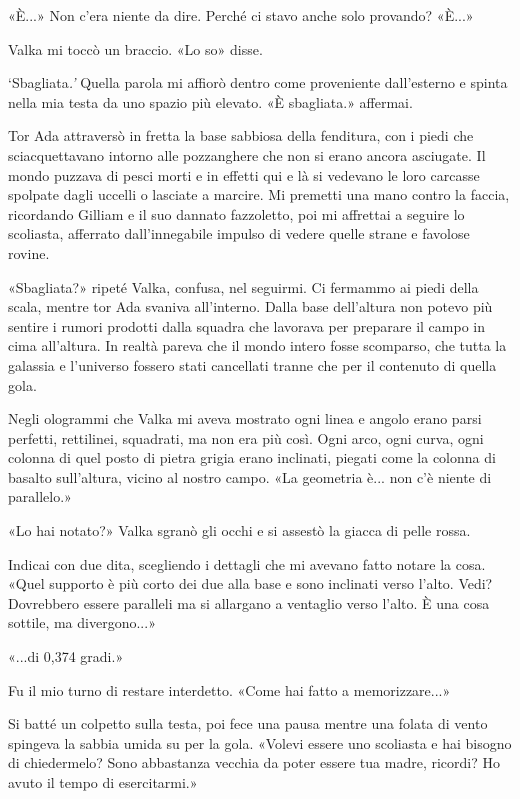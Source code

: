 «È...» Non c'era niente da dire. Perché ci stavo anche solo provando?
«È...»

Valka mi toccò un braccio. «Lo so» disse.

`Sbagliata\emph{.'} Quella parola mi affiorò dentro come proveniente
dall'esterno e spinta nella mia testa da uno spazio più elevato. «È
sbagliata.» affermai.

Tor Ada attraversò in fretta la base sabbiosa della fenditura, con i
piedi che sciacquettavano intorno alle pozzanghere che non si erano
ancora asciugate. Il mondo puzzava di pesci morti e in effetti qui e là
si vedevano le loro carcasse spolpate dagli uccelli o lasciate a
marcire. Mi premetti una mano contro la faccia, ricordando Gilliam e il
suo dannato fazzoletto, poi mi affrettai a seguire lo scoliasta,
afferrato dall'innegabile impulso di vedere quelle strane e favolose
rovine.

«Sbagliata?» ripeté Valka, confusa, nel seguirmi. Ci fermammo ai piedi
della scala, mentre tor Ada svaniva all'interno. Dalla base dell'altura
non potevo più sentire i rumori prodotti dalla squadra che lavorava per
preparare il campo in cima all'altura. In realtà pareva che il mondo
intero fosse scomparso, che tutta la galassia e l'universo fossero stati
cancellati tranne che per il contenuto di quella gola.

Negli ologrammi che Valka mi aveva mostrato ogni linea e angolo erano
parsi perfetti, rettilinei, squadrati, ma non era più così. Ogni arco,
ogni curva, ogni colonna di quel posto di pietra grigia erano inclinati,
piegati come la colonna di basalto sull'altura, vicino al nostro campo.
«La geometria è... non c'è niente di parallelo.»

«Lo hai notato?» Valka sgranò gli occhi e si assestò la giacca di pelle
rossa.

Indicai con due dita, scegliendo i dettagli che mi avevano fatto notare
la cosa. «Quel supporto è più corto dei due alla base e sono inclinati
verso l'alto. Vedi? Dovrebbero essere paralleli ma si allargano a
ventaglio verso l'alto. È una cosa sottile, ma divergono...»

«...di 0,374 gradi.»

Fu il mio turno di restare interdetto. «Come hai fatto a memorizzare...»

Si batté un colpetto sulla testa, poi fece una pausa mentre una folata
di vento spingeva la sabbia umida su per la gola. «Volevi essere uno
scoliasta e hai bisogno di chiedermelo? Sono abbastanza vecchia da poter
essere tua madre, ricordi? Ho avuto il tempo di esercitarmi.»

